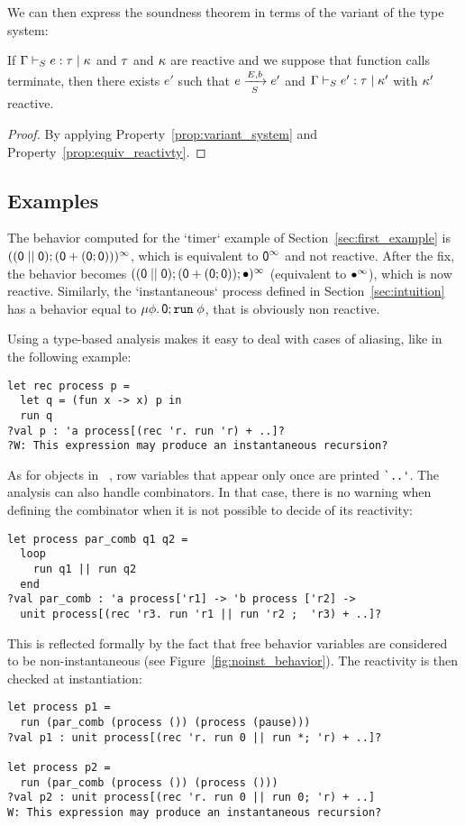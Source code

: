 \documentclass[9pt,preprint]{sigplanconf}
\begin{document}
We can then express the soundness theorem in terms of the variant of the type system:
\begin{theorem}
If \mbox{$\tyjus{\tyenv}{e}{\rt}{\rk}$} and $\rt$ and $\rk$ are reactive and we suppose that function calls terminate, then there exists $e'$ such that \mbox{$\bigstep{N}{e}{e'} {E}{b}{S}$} and \mbox{$\tyjus{\tyenv}{e'}{\rt}{\rk'}$} with $\rk'$ reactive.
\end{theorem}
\begin{proof}
By applying Property~\ref{prop:variant_system} and Property~\ref{prop:equiv_reactivty}.
\end{proof}

\subsection{Examples}

The behavior computed for the `timer` example of Section~\ref{sec:first_example} is \mbox{$\effinf{(\effcon{(\effpar{\effmin}{\effmin})}{(\effor{\effmin}{(\effcon{\effmin}{\effmin})})})}$}, which is equivalent to $\effinf{\effmin}$ and not reactive. After the fix, the behavior becomes \mbox{$\effinf{(\effcon{(\effpar{\effmin}{\effmin})}{\effcon{(\effor{\effmin}{(\effcon{\effmin}{\effmin})})}{\effplus}})}$} (equivalent to $\effinf{\effplus}$), which is now reactive. Similarly, the `instantaneous` process defined in Section~\ref{sec:intuition} has a behavior equal to $\effrec{\effvar}{\effcon{\effmin}{\effrun{\effvar}}}$, that is obviously non reactive.

Using a type-based analysis makes it easy to deal with cases of aliasing, like in the following example:
\begin{lstlisting}
let rec process p =
  let q = (fun x -> x) p in
  run q 
?val p : 'a process[(rec 'r. run 'r) + ..]?
?W: This expression may produce an instantaneous recursion?
\end{lstlisting}
As for objects in \ocaml~\cite{Vouillon:2008}, row variables that appear only once are printed \verb+`..'+.
%
The analysis can also handle combinators. In that case, there is no warning when defining the combinator when it is not possible to decide of its reactivity:
\begin{lstlisting}
let process par_comb q1 q2 =
  loop
    run q1 || run q2
  end
?val par_comb : 'a process['r1] -> 'b process ['r2] ->
  unit process[(rec 'r3. run 'r1 || run 'r2 ;  'r3) + ..]?
\end{lstlisting}
%
This is reflected formally by the fact that free behavior variables are considered to be non-instantaneous (see Figure~\ref{fig:noinst_behavior}). The reactivity is then checked at instantiation:
\begin{lstlisting}
let process p1 = 
  run (par_comb (process ()) (process (pause)))
?val p1 : unit process[(rec 'r. run 0 || run *; 'r) + ..]?

let process p2 = 
  run (par_comb (process ()) (process ()))
?val p2 : unit process[(rec 'r. run 0 || run 0; 'r) + ..]
W: This expression may produce an instantaneous recursion?
\end{lstlisting}
\end{document}

